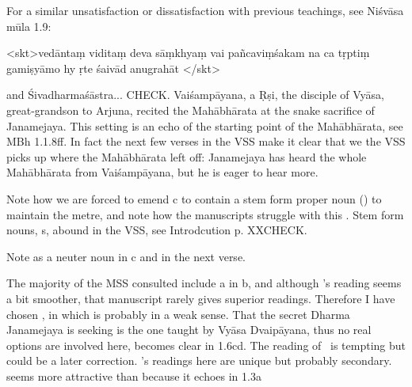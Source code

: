 { For a similar unsatisfaction or dissatisfaction with previous                  teachings, see Niśvāsa mūla 1.9:                 

                 <skt>vedāntaṃ viditaṃ deva sāṃkhyaṃ vai pañcaviṃśakam \danda                      na ca tṛptiṃ gamiṣyāmo hy ṛte śaivād anugrahāt \twodanda</skt>                 

                  and Śivadharmaśāstra... CHECK.  Vaiśampāyana, a Ṛṣi, the disciple of Vyāsa, great-grandson to Arjuna,                   recited the Mahābhārata at the snake sacrifice of                  Janamejaya. This setting is an echo of the starting point of the Mahābhārata, see MBh 1.1.8ff.                 In fact the next few verses in the VSS make it clear that we the VSS                 picks up where the Mahābhārata left off: Janamejaya has heard the whole Mahābhārata from                 Vaiśampāyana, but he is eager to hear more.                 

                 Note how we are forced to emend  c to contain a stem form proper noun ()                 to maintain the metre, and note how the manuscripts struggle with this .                 Stem form nouns, s, abound in the VSS, see Introdcution p. XXCHECK.          }





{ Note  as a neuter noun in  c and in the next verse. }





{ The majority of the MSS consulted include a  in  b,                  and although \msCb's reading seems a bit smoother, that manuscript rarely gives superior readings.                 Therefore I have chosen , in which  is probably in a weak sense.                 That the secret Dharma Janamejaya is seeking is the one taught by Vyāsa Dvaipāyana,                 thus no real options are involved here, becomes clear in 1.6cd.                 The reading of \msM\ is tempting but could be a later correction.  \msM's readings here are unique but probably secondary.  seems more                 attractive than  because it echoes  in 1.3a }





